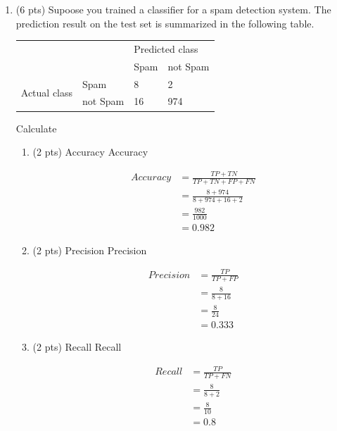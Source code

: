 \documentclass[a4paper]{article}
\theoremstyle{definition}
\newenvironment{soln}{
    \leavevmode\color{blue}\ignorespaces
}{}
\begin{document}
\begin{enumerate}
\item (6 pts) Supoose you trained a classifier for a spam detection system. The prediction result on the test set is summarized in the following table.
\begin{center}
	\begin{tabular}{l l | l l}
		&          & \multicolumn{2}{l}{Predicted class} \\
		&          & Spam           & not Spam           \\
		\hline
		\multirow{2}{*}{Actual class} & Spam     & 8              & 2                  \\
		& not Spam & 16             & 974               
	\end{tabular}
\end{center}

Calculate
\begin{enumerate}
	\item (2 pts) Accuracy
	\begin{soln}  Accuracy

		$$
		\begin{align}
		Accuracy 
		&= \frac{TP + TN}{TP + TN + FP + FN} \\
		&= \frac{8 + 974}{8 + 974 + 16 + 2} \\
		&= \frac{982}{1000} \\
		&= 0.982
		\end{align}
		$$
	
	\end{soln}
	\item (2 pts) Precision
	\begin{soln}  Precision

		$$
		\begin{align}
		Precision &= \frac{TP}{TP + FP} \\
		&= \frac{8}{8 + 16} \\
		&= \frac{8}{24} \\
		&= 0.333
		\end{align}
		$$
	
	\end{soln}
	\item (2 pts) Recall
	\begin{soln}  Recall

		$$
		\begin{align}
		Recall &= \frac{TP}{TP + FN} \\
		&= \frac{8}{8 + 2} \\
		&= \frac{8}{10} \\
		&= 0.8
		\end{align}
		$$
	

\end{soln}
\end{enumerate}
\end{enumerate}
\end{document}
